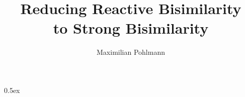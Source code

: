 \documentclass[11pt,a4paper,openany]{book}
\begin{document}
\title{Reducing Reactive Bisimilarity\\to Strong Bisimilarity}
\author{Maximilian Pohlmann}



\newpage\null\thispagestyle{empty}\newpage

\tableofcontents
\newpage\null\thispagestyle{empty}\newpage


\parindent 0pt\parskip 0.5ex
















{


}

\appendix




\newpage\null\thispagestyle{empty}

\newpage


\newpage

\end{document}
